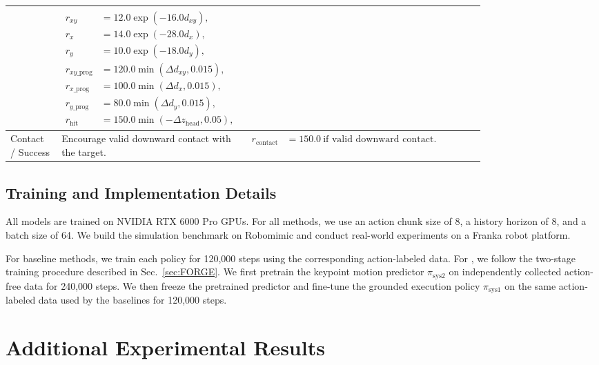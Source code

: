 \begin{table}[p]
{\begin{tabular}{lp{0.30\linewidth}p{0.50\linewidth}}
& 
$
\begin{aligned}
r_{xy} &= 12.0\exp(-16.0 d_{xy}), \\
r_x &= 14.0\exp(-28.0 d_x), \\
r_y &= 10.0\exp(-18.0 d_y), \\
r_{xy\_\mathrm{prog}} &= 120.0\min(\Delta d_{xy}, 0.015), \\
r_{x\_\mathrm{prog}} &= 100.0\min(\Delta d_x, 0.015), \\
r_{y\_\mathrm{prog}} &= 80.0\min(\Delta d_y, 0.015), \\
r_{\mathrm{hit}} &= 150.0\min(-\Delta z_{\mathrm{head}}, 0.05),
\end{aligned}
$
\\
\midrule
Contact / Success 
& Encourage valid downward contact with the target.
& 
$
\begin{aligned}
r_{\mathrm{contact}} &= 150.0 \ \text{if valid downward contact}.
\end{aligned}
$
\\
\bottomrule
\end{tabular}
}
\end{table}
\FloatBarrier

\subsection{Training and Implementation Details}
\label{app:implementation_details}

All models are trained on NVIDIA RTX 6000 Pro GPUs. For all methods, we use an action chunk size of 8, a history horizon of 8, and a batch size of 64. We build the simulation benchmark on Robomimic and conduct real-world experiments on a Franka robot platform.

For baseline methods, we train each policy for 120,000 steps using the corresponding action-labeled data. For \algoname{}, we follow the two-stage training procedure described in Sec.~\ref{sec:FORGE}. 
We first pretrain the keypoint motion predictor $\pi_{\mathrm{sys2}}$ on independently collected action-free data for 240,000 steps.
We then freeze the pretrained predictor and fine-tune the grounded execution policy $\pi_{\mathrm{sys1}}$ on the same action-labeled data used by the baselines for 120,000 steps.


\section{Additional Experimental Results}
\label{app:additional_experimental_results}

